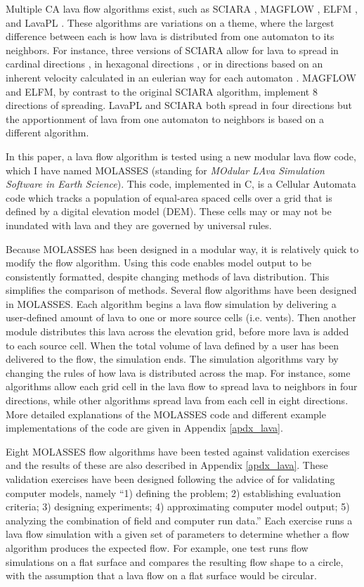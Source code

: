 	Multiple CA lava flow algorithms exist, such as SCIARA \citep{crisci2004simulation}, MAGFLOW \citep{del2008simulations}, ELFM \citep{damiani2006lava}, and LavaPL \citep{connor2012probabilistic}. These algorithms are variations on a theme, where the largest difference between each is how lava is distributed from one automaton to its neighbors. For instance, three versions of SCIARA allow for lava to spread in cardinal directions \citep{barca1994cellular}, in hexagonal directions \citep{crisci2008lava}, or in directions based on an inherent velocity calculated in an eulerian way for each automaton \citep{avolio2006sciara}. MAGFLOW and ELFM, by contrast to the original SCIARA algorithm, implement 8 directions of spreading. LavaPL and SCIARA both spread in four directions but the apportionment of lava from one automaton to neighbors is based on a different algorithm.

	In this paper, a lava flow algorithm is tested using a new modular lava flow code, which I have named MOLASSES (standing for \textit{MOdular LAva Simulation Software in Earth Science}). This code, implemented in C, is a Cellular Automata code which tracks a population of equal-area spaced cells over a grid that is defined by a digital elevation model (DEM). These cells may or may not be inundated with lava and they are governed by universal rules. 
	
	Because MOLASSES has been designed in a modular way, it is relatively quick to modify the flow algorithm. Using this code enables model output to be consistently formatted, despite changing methods of lava distribution. This simplifies the comparison of methods. Several flow algorithms have been designed in MOLASSES. Each algorithm begins a lava flow simulation by delivering a user-defined amount of lava to one or more source cells (i.e. vents). Then another module distributes this lava across the elevation grid, before more lava is added to each source cell. When the total volume of lava defined by a user has been delivered to the flow, the simulation ends. The simulation algorithms vary by changing the rules of how lava is distributed across the map. For instance, some algorithms allow each grid cell in the lava flow to spread lava to neighbors in four directions, while other algorithms spread lava from each cell in eight directions. More detailed explanations of the MOLASSES code and different example implementations of the code are given in Appendix \ref{apdx_lava}.
	
	Eight MOLASSES flow algorithms have been tested against validation exercises and the results of these are also described in Appendix \ref{apdx_lava}. These validation exercises have been designed following the advice of \citet{bayarri2007framework} for validating computer models, namely ``1) defining the problem; 2) establishing evaluation criteria; 3) designing experiments; 4) approximating computer model output; 5) analyzing the combination of field and computer run data.'' Each exercise runs a lava flow simulation with a given set of parameters to determine whether a flow algorithm produces the expected flow. For example, one test runs flow simulations on a flat surface and compares the resulting flow shape to a circle, with the assumption that a lava flow on a flat surface would be circular.
	

